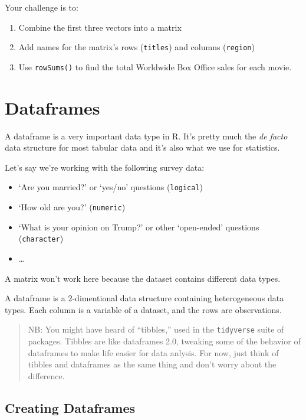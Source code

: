 \documentclass[]{book}
\providecommand{\tightlist}{%
  \setlength{\itemsep}{0pt}\setlength{\parskip}{0pt}}
\begin{document}
Your challenge is to:

\begin{enumerate}
\def\labelenumi{\arabic{enumi}.}
\tightlist
\item
  Combine the first three vectors into a matrix
\item
  Add names for the matrix's rows (\texttt{titles}) and columns (\texttt{region})
\item
  Use \texttt{rowSums()} to find the total Worldwide Box Office sales for each movie.
\end{enumerate}

\hypertarget{dataframes}{%
\section{Dataframes}\label{dataframes}}

A dataframe is a very important data type in R. It's pretty much the \emph{de facto} data structure for most tabular data and it's also what we use for statistics.

Let's say we're working with the following survey data:

\begin{itemize}
\tightlist
\item
  `Are you married?' or `yes/no' questions (\texttt{logical})
\item
  `How old are you?' (\texttt{numeric})
\item
  `What is your opinion on Trump?' or other `open-ended' questions (\texttt{character})
\item
  \ldots{}
\end{itemize}

A matrix won't work here because the dataset contains different data types.

A dataframe is a 2-dimentional data structure containing heterogeneous data types. Each column is a variable of a dataset, and the rows are observations.

\begin{quote}
NB: You might have heard of ``tibbles,'' used in the \texttt{tidyverse} suite of packages. Tibbles are like dataframes 2.0, tweaking some of the behavior of dataframes to make life easier for data anlysis. For now, just think of tibbles and dataframes as the same thing and don't worry about the difference.
\end{quote}

\hypertarget{creating-dataframes}{%
\subsection{Creating Dataframes}\label{creating-dataframes}}
\end{document}
